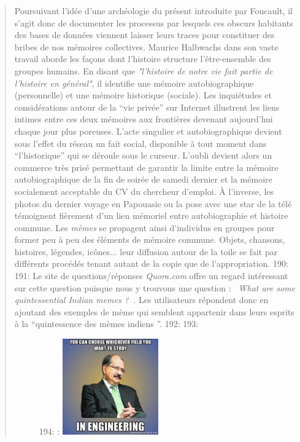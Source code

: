 \begin{quote}
Poursuivant l{\textquoteright}id\'ee d{\textquoteright}une arch\'eologie du pr\'esent introduite par Foucault, il s{\textquoteright}agit donc de documenter les processus par lesquels ces obscurs habitants des bases de donn\'ees viennent laisser leurs traces pour constituer des bribes de nos m\'emoires collectives. Maurice Halbwachs dans son vaste travail aborde les fa\c{c}ons dont l{\textquoteright}histoire structure l{\textquoteright}\^etre-ensemble des groupes humains. En disant que \textit{"l'histoire de notre vie fait partie de l'histoire en général"}\cite{Halbwachs1947}, il identifie une m\'emoire autobiographique (personnelle) et une m\'emoire historique (sociale). Les inqui\'etudes et consid\'erations autour de la {\textquotedblleft}vie priv\'ee{\textquotedblright} sur Internet illustrent les liens intimes entre ces deux m\'emoires aux fronti\`eres devenant aujourd{\textquoteright}hui chaque jour plus poreuses. L{\textquoteright}acte singulier et autobiographique devient sous l{\textquoteright}effet du r\'eseau un fait social, disponible \`a tout moment dans {\textquotedblleft}l{\textquoteright}historique{\textquotedblright} qui se d\'eroule sous le curseur. L{\textquoteright}oubli devient alors un commerce tr\`es pris\'e permettant de garantir la limite entre la m\'emoire autobiographique de la fin de soir\'ee de samedi dernier et la m\'emoire socialement acceptable du CV du chercheur d{\textquoteright}emploi. \`A l{\textquoteright}inverse, les photos du dernier voyage en Papouasie ou la pose avec une star de la t\'el\'e t\'emoignent fi\`erement d{\textquoteright}un lien m\'emoriel entre autobiographie et histoire commune. Les \textit{m\`emes} se propagent ainsi d{\textquoteright}individus en groupes pour former peu \`a peu des \'el\'ements de m\'emoire commune. Objets, chansons, histoires, l\'egendes, ic\^ones... leur diffusion autour de la toile se fait par diff\'erents proc\'ed\'es tenant autant de la copie que de l{\textquoteright}appropriation. 
190: 
191: Le site de questions/r\'eponses \textit{Quora.com} offre un regard int\'eressant sur cette question puisque nous y trouvons une question : \textit{{\guillemotleft}~What are some quintessential Indian memes ?~{\guillemotright}.} Les utilisateurs r\'epondent donc en ajoutant des exemples de m\`eme qui semblent appartenir dans leurs esprits \`a la {\textquotedblleft}quintessence des m\`emes indiens {\textquotedblright}. 
192: 
193: \begin{figure}[h]
194:     :     \includegraphics[width=1.6224in,height=1.6224in]{figures/chap2/chapitre2-img5.jpg}

\end{figure}
\end{quote}
